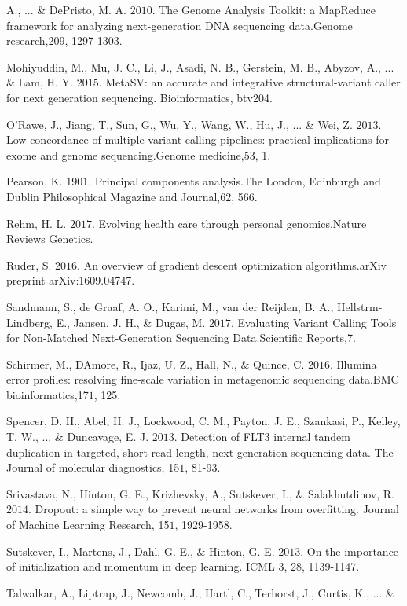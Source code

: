 \documentclass{article}
\begin{document}
\begin{list}{}{%
\setlength{\topsep}{0pt}%
\setlength{\leftmargin}{0.5in}%
\setlength{\listparindent}{-0.5in}%
\setlength{\itemindent}{-0.5in}%
\setlength{\parsep}{\parskip}%
}
A., ... \& DePristo, M. A. \(2010\). The Genome Analysis Toolkit: a MapReduce framework for analyzing next-generation DNA sequencing data.Genome research,20\(9\), 1297-1303.\\\item[] Mohiyuddin, M., Mu, J. C., Li, J., Asadi, N. B., Gerstein, M. B., Abyzov, A., ... \& Lam, H. Y. \(2015\). MetaSV: an accurate and integrative structural-variant caller for next generation sequencing. Bioinformatics, btv204.\\\item[] O'Rawe, J., Jiang, T., Sun, G., Wu, Y., Wang, W., Hu, J., ... \& Wei, Z. \(2013\). Low concordance of multiple variant-calling pipelines: practical implications for exome and genome sequencing.Genome medicine,5\(3\), 1.\\\item[] Pearson, K. \(1901\). Principal components analysis.The London, Edinburgh and Dublin Philosophical Magazine and Journal,6\(2\), 566.\\\item[] Rehm, H. L. \(2017\). Evolving health care through personal genomics.Nature Reviews Genetics.\\\item[] Ruder, S. \(2016\). An overview of gradient descent optimization algorithms.arXiv preprint arXiv:1609.04747.\\\item[] Sandmann, S., de Graaf, A. O., Karimi, M., van der Reijden, B. A., Hellstrm-Lindberg, E., Jansen, J. H., \& Dugas, M. \(2017\). Evaluating Variant Calling Tools for Non-Matched Next-Generation Sequencing Data.Scientific Reports,7.\\\item[] Schirmer, M., DAmore, R., Ijaz, U. Z., Hall, N., \& Quince, C. \(2016\). Illumina error profiles: resolving fine-scale variation in metagenomic sequencing data.BMC bioinformatics,17\(1\), 125.\\\item[] Spencer, D. H., Abel, H. J., Lockwood, C. M., Payton, J. E., Szankasi, P., Kelley, T. W., ... \& Duncavage, E. J. \(2013\). Detection of FLT3 internal tandem duplication in targeted, short-read-length, next-generation sequencing data. The Journal of molecular diagnostics, 15\(1\), 81-93.\\\item[] Srivastava, N., Hinton, G. E., Krizhevsky, A., Sutskever, I., \& Salakhutdinov, R. \(2014\). Dropout: a simple way to prevent neural networks from overfitting. Journal of Machine Learning Research, 15\(1\), 1929-1958.\\\item[] Sutskever, I., Martens, J., Dahl, G. E., \& Hinton, G. E. \(2013\). On the importance of initialization and momentum in deep learning. ICML \(3\), 28, 1139-1147.\\\item[] Talwalkar, A., Liptrap, J., Newcomb, J., Hartl, C., Terhorst, J., Curtis, K., ... \& 
\end{list}
\end{document}
